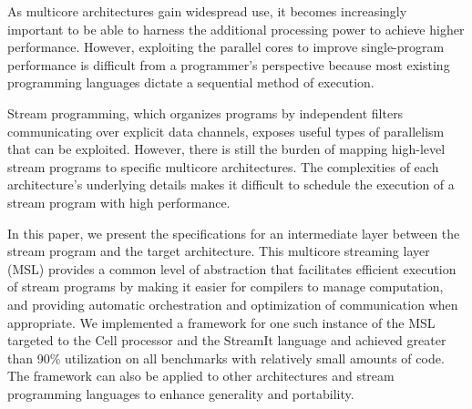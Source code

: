 %
%
%
%
%
%
%
%
% 
% 
%

As multicore architectures gain widespread use, it becomes
increasingly important to be able to harness the additional processing
power to achieve higher performance. However, exploiting the parallel
cores to improve single-program performance is difficult from a
programmer's perspective because most existing programming languages
dictate a sequential method of execution.

Stream programming, which organizes programs by independent filters
communicating over explicit data channels,  exposes useful types of
parallelism that can be exploited. However, there is still the burden
of mapping high-level stream programs to specific multicore
architectures. The complexities of each architecture's underlying
details makes it difficult to schedule the execution of a stream
program with high performance.

In this paper, we present the specifications for an intermediate layer
between the stream program and the target architecture. This multicore
streaming layer (MSL) provides a common level of abstraction that
facilitates efficient execution of stream programs by making it easier
for compilers to manage computation, and providing automatic
orchestration and optimization of communication when appropriate. We
implemented a framework for one such instance of the MSL targeted to
the Cell processor and the StreamIt language and achieved greater than
90\% utilization on all benchmarks with relatively small amounts of
code. The framework can also be applied to other architectures and
stream programming languages to enhance generality and portability.

